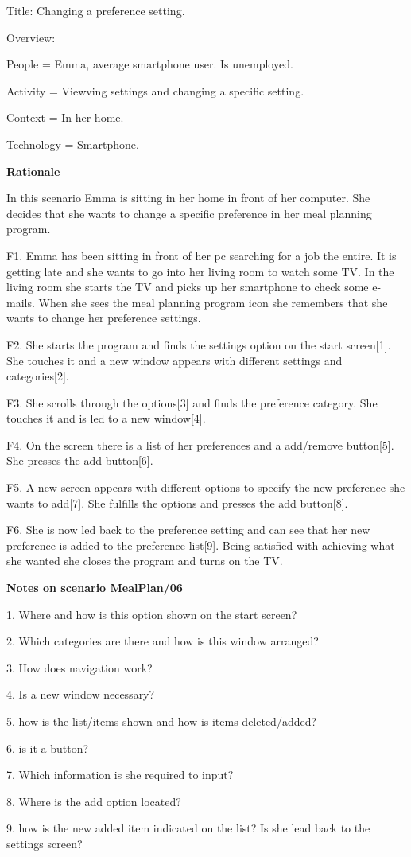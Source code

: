 Title: Changing a preference setting.

Overview:

	People = Emma, average smartphone user. Is unemployed.

	Activity = Viewving settings and changing a specific setting.

	Context = In her home.

	Technology = Smartphone.

\textbf{Rationale}

In this scenario Emma is sitting in her home in front of her computer. She decides that she wants to change a specific preference in her meal planning program.

	F1. Emma has been sitting in front of her pc searching for a job the entire. It is getting late and she wants to go into her living room to watch some TV. In the living room she starts the TV and picks up her smartphone to check some e-mails. When she sees the meal planning program icon she remembers that she wants to change her preference settings.
	
	F2. She starts the program and finds the settings option on the start screen[1]. She touches it and a new window appears with different settings and categories[2].
	
	F3. She scrolls through the options[3] and finds the preference category. She touches it and is led to a new window[4].
	
	F4. On the screen there is a list of her preferences and a add/remove button[5]. She presses the add button[6].
	
	F5. A new screen appears with different options to specify the new preference she wants to add[7]. She fulfills the options and presses the add button[8].
	
	F6. She is now led back to the preference setting and can see that her new preference is added to the preference list[9]. Being satisfied with achieving what she wanted she closes the program and turns on the TV.
	 
\textbf{Notes on scenario MealPlan/06}

1. Where and how is this option shown on the start screen? 

2. Which categories are there and how is this window arranged?

3. How does navigation work?

4. Is a new window necessary?

5. how is the list/items shown and how is items deleted/added?

6. is it a button?

7. Which information is she required to input?

8. Where is the add option located?

9. how is the new added item indicated on the list? Is she lead back to the settings screen?

